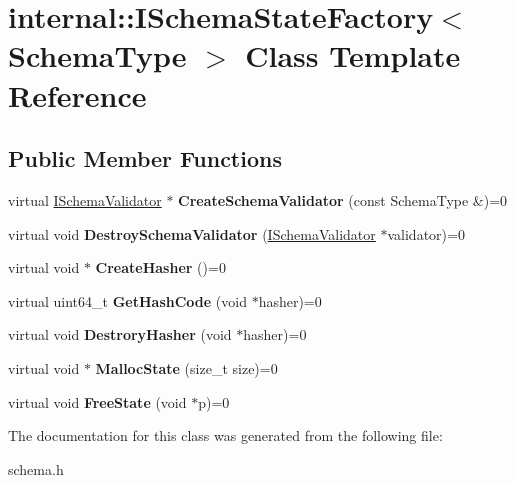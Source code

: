 \hypertarget{a02364}{}\section{internal\+:\+:I\+Schema\+State\+Factory$<$ Schema\+Type $>$ Class Template Reference}
\label{a02364}
\subsection*{Public Member Functions}
\begin{DoxyCompactItemize}
\item 
\mbox{\label{a02364_ae8c98fcff6a057b4fcd9018fc14551a8}} 
virtual \hyperlink{a02360}{I\+Schema\+Validator} $\ast$ {\bfseries Create\+Schema\+Validator} (const Schema\+Type \&)=0
\item 
\mbox{\label{a02364_a112cbf154077050bc30ffe670032442c}} 
virtual void {\bfseries Destroy\+Schema\+Validator} (\hyperlink{a02360}{I\+Schema\+Validator} $\ast$validator)=0
\item 
\mbox{\label{a02364_a4ac37b9d3e9526004c82692473f978f4}} 
virtual void $\ast$ {\bfseries Create\+Hasher} ()=0
\item 
\mbox{\label{a02364_addfcf00963cc777edf642b204f07c8d6}} 
virtual uint64\+\_\+t {\bfseries Get\+Hash\+Code} (void $\ast$hasher)=0
\item 
\mbox{\label{a02364_a70b8d88180d2e6993105b17f19101635}} 
virtual void {\bfseries Destrory\+Hasher} (void $\ast$hasher)=0
\item 
\mbox{\label{a02364_ada92ebf8e9ef994f7e20a0f7f9750519}} 
virtual void $\ast$ {\bfseries Malloc\+State} (size\+\_\+t size)=0
\item 
\mbox{\label{a02364_a27bd2138940cac3c330dd8399c49b22b}} 
virtual void {\bfseries Free\+State} (void $\ast$p)=0
\end{DoxyCompactItemize}


The documentation for this class was generated from the following file\+:\begin{DoxyCompactItemize}
\item 
schema.\+h\end{DoxyCompactItemize}
